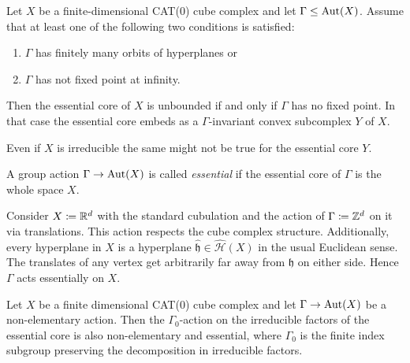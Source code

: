 \begin{prop}
  \label{prop:cs-3.5}
  Let \(X\) be a finite-dimensional CAT(0) cube complex and let \(\Gamma \leq \operatorname{Aut}(X)\). Assume that at least one of the following two conditions is satisfied:
  \begin{enumerate}
  \item \(\Gamma\) has finitely many orbits of hyperplanes or
  \item \(\Gamma\) has not fixed point at infinity.
  \end{enumerate}
  Then the essential core of \(X\) is unbounded if and only if \(\Gamma\) has no fixed point. In that case the essential core embeds as a \(\Gamma\)-invariant convex subcomplex \(Y\) of \(X\).
\end{prop}

\begin{rem}
  Even if \(X\) is irreducible the same might not be true for the essential core \(Y\). 
\end{rem}

\begin{defin}
  A group action \(\Gamma \to \operatorname{Aut}(X)\) is called \emph{essential} if the essential core of \(\Gamma\) is the whole space \(X\).
\end{defin}

\begin{bsp}
  Consider \(X\coloneqq \mathbb{R}^d\) with the standard cubulation and the action of \(\Gamma \coloneqq \mathbb{Z}^d\) on it via translations. This action respects the cube complex structure. Additionally, every hyperplane in \(X\) is a hyperplane \(\mathfrak{\hat h} \in \mathcal{\hat H}(X)\) in the usual Euclidean sense. The translates of any vertex get arbitrarily far away from \(\mathfrak{h}\) on either side. Hence \(\Gamma\) acts essentially on \(X\).
\end{bsp}

\begin{lemma}[{\cite[Lemma~2.28]{MR3509968}}]
  \label{lem:2.28}
  Let \(X\) be a finite dimensional CAT(0) cube complex and let \(\Gamma \to \operatorname{Aut}(X)\) be a non-elementary action. Then the \(\Gamma_0\)-action on the irreducible factors of the essential core is also non-elementary and essential, where \(\Gamma_0\) is the finite index subgroup preserving the decomposition in irreducible factors.
\end{lemma}

